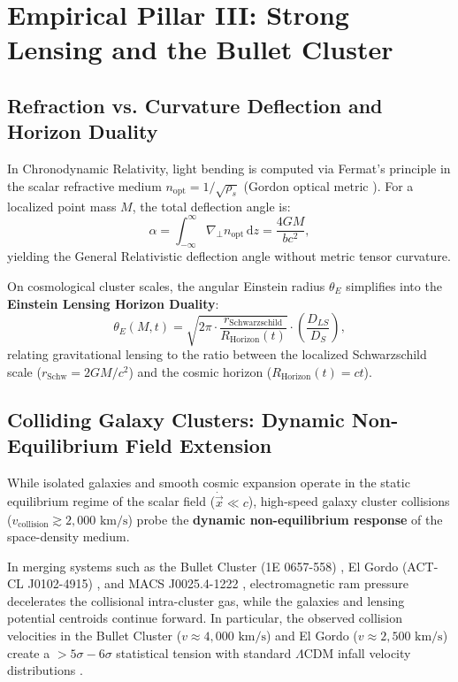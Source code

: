 \documentclass[aps,prd,reprint,superscriptaddress,nofootinbib,floatfix,amsmath,amssymb]{revtex4-2}
\begin{document}
\section{Empirical Pillar III: Strong Lensing and the Bullet Cluster}
\label{sec:lensing}

\subsection{Refraction vs. Curvature Deflection and Horizon Duality}

In Chronodynamic Relativity, light bending is computed via Fermat's principle in the scalar refractive medium $n_{\text{opt}} = 1/\sqrt{\rho_s}$ (Gordon optical metric \cite{Gordon1923}). For a localized point mass $M$, the total deflection angle is:
\begin{equation}
\alpha = \int_{-\infty}^{\infty} \nabla_\perp n_{\text{opt}} \, \mathrm{d}z = \frac{4 G M}{b c^2},
\label{eq:lensing_angle}
\end{equation}
yielding the General Relativistic deflection angle without metric tensor curvature.

On cosmological cluster scales, the angular Einstein radius $\theta_E$ simplifies into the \textbf{Einstein Lensing Horizon Duality}:
\begin{equation}
\theta_E(M, t) = \sqrt{2\pi \cdot \frac{r_{\text{Schwarzschild}}}{R_{\text{Horizon}}(t)}} \cdot \left(\frac{D_{LS}}{D_S}\right),
\label{eq:einstein_duality}
\end{equation}
relating gravitational lensing to the ratio between the localized Schwarzschild scale ($r_{\text{Schw}} = 2GM/c^2$) and the cosmic horizon ($R_{\text{Horizon}}(t) = c t$).

\subsection{Colliding Galaxy Clusters: Dynamic Non-Equilibrium Field Extension}
\label{sec:cluster_mergers}

While isolated galaxies and smooth cosmic expansion operate in the static equilibrium regime of the scalar field ($\dot{\vec{x}} \ll c$), high-speed galaxy cluster collisions ($v_{\text{collision}} \gtrsim 2,000\text{ km/s}$) probe the \textbf{dynamic non-equilibrium response} of the space-density medium. 

In merging systems such as the Bullet Cluster (1E 0657-558) \cite{BulletCluster2006}, El Gordo (ACT-CL J0102-4915) \cite{ElGordo2021}, and MACS J0025.4-1222 \cite{MACSJ0025}, electromagnetic ram pressure decelerates the collisional intra-cluster gas, while the galaxies and lensing potential centroids continue forward. In particular, the observed collision velocities in the Bullet Cluster ($v \approx 4,000\text{ km/s}$) and El Gordo ($v \approx 2,500\text{ km/s}$) create a $>5\sigma-6\sigma$ statistical tension with standard $\Lambda\text{CDM}$ infall velocity distributions \cite{ElGordo2021}.
\end{document}
